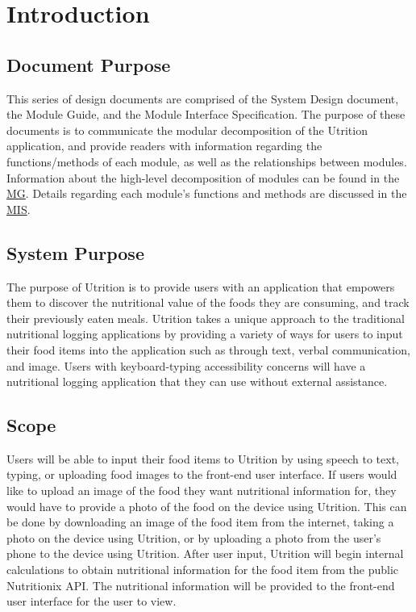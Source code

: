 \documentclass[12pt, titlepage]{article}
\begin{document}
\newpage

\tableofcontents

\listoftables

\listoffigures

\newpage


\section{Introduction}


\subsection{Document Purpose}

This series of design documents are comprised of the System Design document, 
the Module Guide, and the Module Interface Specification. The purpose of these 
documents is to communicate the modular decomposition of 
the Utrition application, and provide readers with information regarding the 
functions/methods of each module, as well as the relationships between modules. 
Information about the high-level decomposition of modules can be found in 
the \href{../SoftArchitecture/MG.pdf}{MG}.
Details regarding each module's functions and methods are discussed in 
the \href{../SoftDetailedDes/MIS.pdf}{MIS}.

\subsection{System Purpose}

The purpose of Utrition is to provide users with an application that empowers 
them to discover the nutritional value of the foods they are consuming, and track
their previously eaten meals. Utrition takes a unique approach to the traditional nutritional logging applications by providing a variety of ways for users to input their food items into the application such as through text, verbal communication, and image. Users with keyboard-typing accessibility concerns will have a nutritional logging application that they can use without external assistance.

\subsection{Scope}

Users will be able to input their food items to Utrition by using speech to text, typing, or uploading food images to the front-end user interface. If users would like to upload an image of the food they want nutritional information for, they would have to provide a photo of the food on the device using Utrition. This can be done by downloading an image of the food item from the internet, taking a photo on the device using Utrition, or by uploading a photo from the user's phone to the device using Utrition. After user input, Utrition will begin internal calculations to obtain nutritional information for the food item from the public Nutritionix API. The nutritional information will be provided to the front-end user interface for the user to view.
\end{document}
